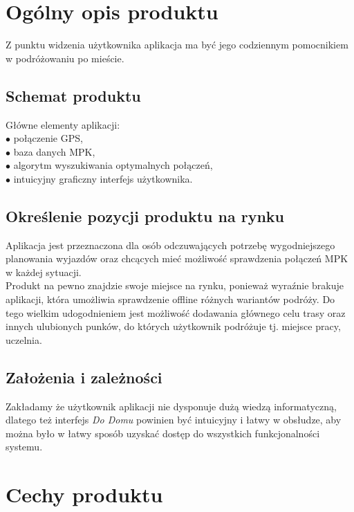 \documentclass[12pt,a4paper]{article}
\begin{document}
    \section{Ogólny opis produktu}

Z punktu widzenia użytkownika aplikacja ma być jego codziennym pomocnikiem w podróżowaniu po mieście. 

	\subsection{Schemat produktu}
	Główne elementy aplikacji: \\
	$\bullet$ połączenie GPS, \\
	$\bullet$ baza danych MPK, \\
	$\bullet$ algorytm wyszukiwania optymalnych połączeń, \\
	$\bullet$ intuicyjny graficzny interfejs użytkownika.	
 
	\subsection{Określenie pozycji produktu na rynku}
	
Aplikacja jest przeznaczona dla osób odczuwających potrzebę wygodniejszego planowania wyjazdów oraz chcących mieć możliwość sprawdzenia połączeń MPK w każdej sytuacji. \\ 

Produkt na pewno znajdzie swoje miejsce na rynku, ponieważ wyraźnie brakuje aplikacji, która umożliwia sprawdzenie offline różnych wariantów podróży. Do tego wielkim udogodnieniem jest możliwość dodawania głównego celu trasy oraz innych ulubionych punków, do których użytkownik podróżuje tj. miejsce pracy, uczelnia.

	\subsection{Założenia i zależności}	
	
Zakładamy że użytkownik aplikacji nie dysponuje dużą wiedzą informatyczną, dlatego też interfejs \textit{Do Domu} powinien być intuicyjny i łatwy w obsłudze, aby można było w łatwy sposób uzyskać dostęp do wszystkich funkcjonalności systemu.

\newpage

\section{Cechy produktu}
\end{document}
